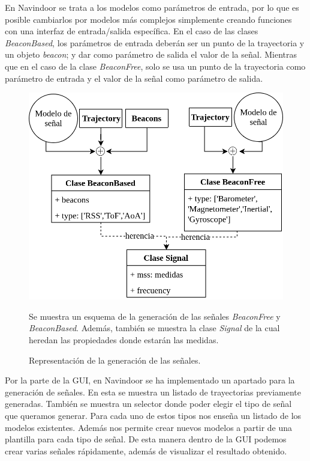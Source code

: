 

En Navindoor se trata a los modelos como parámetros de entrada, por lo que es posible cambiarlos por modelos más complejos simplemente creando funciones con una interfaz de entrada/salida específica. En el caso de las clases \emph{BeaconBased}, los parámetros de entrada deberán ser un punto de la trayectoria y un objeto \emph{beacon}; y dar como parámetro de salida el valor de la señal. Mientras que en el caso de la clase \emph{BeaconFree}, solo se usa un punto de la trayectoria como parámetro de entrada y el valor de la señal como parámetro de salida.

\begin{figure}[ht!]
    \centering
        \includegraphics[width=0.85\columnwidth]{img/Design/signaldiagram.png}
        \caption{Representación de la generación de las señales.}
        \footnotesize
        Se muestra un esquema de la generación de las señales \emph{BeaconFree} y \emph{BeaconBased}. Además, también se muestra la clase \emph{Signal} de la cual heredan las propiedades donde estarán las medidas.
        \label{schemaBB}
    \end{figure} 

 

Por la parte de la GUI, en Navindoor se ha implementado un apartado para la generación de señales. En esta se muestra un listado de trayectorias previamente generadas. También se muestra un selector donde poder elegir el tipo de señal que queramos generar. Para cada uno de estos tipos nos enseña un listado de los modelos existentes. Además nos permite crear nuevos modelos a partir de una plantilla para cada tipo de señal. De esta manera dentro de la GUI podemos crear varias señales rápidamente, además de visualizar el resultado obtenido. 

